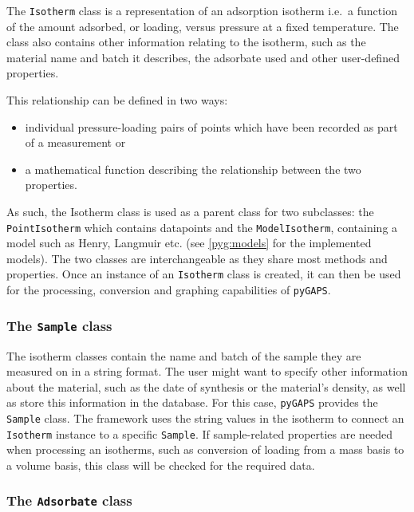 The \texttt{Isotherm} class is a representation of an adsorption 
isotherm i.e.\ a function of the amount adsorbed, or loading, 
versus pressure at a fixed temperature. The class also contains
other information relating to the isotherm, such as the material
name and batch it describes, the adsorbate used and other 
user-defined properties.

This relationship can be defined in two ways:

\begin{itemize}
    \item individual pressure-loading pairs of points which have 
    been recorded as part of a measurement or
    \item a mathematical function describing the relationship 
    between the two properties. 
\end{itemize}

As such, the Isotherm class is used as a parent class for two subclasses: 
the \texttt{PointIsotherm} which contains datapoints and the
\texttt{ModelIsotherm}, containing a model such as Henry, Langmuir etc.
(see \autoref{pyg:models} for the implemented models).
The two classes are interchangeable 
as they share most methods and properties. Once an instance of 
an \texttt{Isotherm} class is created, it can then be used for the 
processing, conversion and graphing capabilities of \texttt{pyGAPS}.

\subsubsection{The \texttt{Sample} class}

The isotherm classes contain the name and batch of the sample 
they are measured on in a string format. The user might want to 
specify other information about the material,
such as the date of synthesis or the material's density,
as well as store this information in the database.
For this case, \texttt{pyGAPS} provides the \texttt{Sample} class.
The framework uses the string values
in the isotherm to connect an \texttt{Isotherm} instance to a 
specific \texttt{Sample}. If sample-related properties are 
needed when processing an isotherms, such as conversion of loading
from a mass basis to a volume basis, this class will be 
checked for the required data.

\subsubsection{The \texttt{Adsorbate} class}

